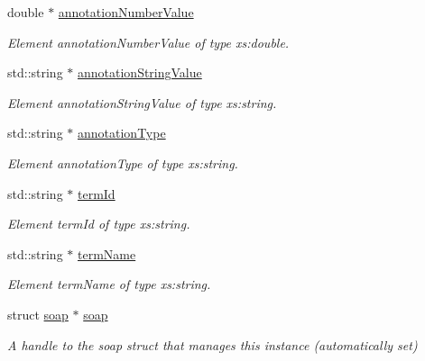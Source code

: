 \begin{DoxyCompactItemize}
\item 
double $\ast$ \hyperlink{classns3____DataHolder_a7032400955e9a4998555a8b1af23cdaa}{annotationNumberValue}
\begin{DoxyCompactList}\small\item\em Element annotationNumberValue of type xs:double. \end{DoxyCompactList}\item 
std::string $\ast$ \hyperlink{classns3____DataHolder_a5217a69d2daed0559757d76e606c2124}{annotationStringValue}
\begin{DoxyCompactList}\small\item\em Element annotationStringValue of type xs:string. \end{DoxyCompactList}\item 
std::string $\ast$ \hyperlink{classns3____DataHolder_a90aa873b08e6e6b22c6a5c379749653a}{annotationType}
\begin{DoxyCompactList}\small\item\em Element annotationType of type xs:string. \end{DoxyCompactList}\item 
std::string $\ast$ \hyperlink{classns3____DataHolder_aef8ad62355d41f92fb80a139531394f3}{termId}
\begin{DoxyCompactList}\small\item\em Element termId of type xs:string. \end{DoxyCompactList}\item 
std::string $\ast$ \hyperlink{classns3____DataHolder_a4eadd86c4e0badbcadae7742becc25f8}{termName}
\begin{DoxyCompactList}\small\item\em Element termName of type xs:string. \end{DoxyCompactList}\item 
\hypertarget{classns3____DataHolder_a601e3e4e48a7d8eb9f2e29a68a333563}{
struct \hyperlink{classns3____DataHolder_a601e3e4e48a7d8eb9f2e29a68a333563}{soap} $\ast$ \hyperlink{classns3____DataHolder_a601e3e4e48a7d8eb9f2e29a68a333563}{soap}}
\label{classns3____DataHolder_a601e3e4e48a7d8eb9f2e29a68a333563}

\begin{DoxyCompactList}\small\item\em A handle to the soap struct that manages this instance (automatically set) \end{DoxyCompactList}\end{DoxyCompactItemize}



